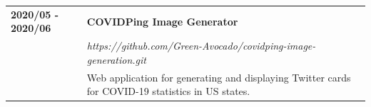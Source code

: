 \documentclass[letterpaper]{article}
\begin{document}
        \begin{tabular}{p{} p{}} 
            \textbf{2020/05 - 2020/06} & \large\textbf{COVIDPing Image Generator} \\
            & \emph{https://github.com/Green-Avocado/covidping-image-generation.git} \\
            & Web application for generating and displaying Twitter cards for COVID-19 statistics in US states. \\
        \end{tabular}
\end{document}
